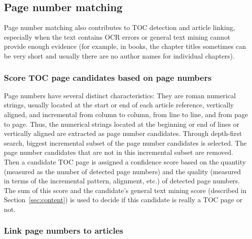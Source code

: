 \documentclass[10pt]{article}
\begin{document}
\subsection{Page number matching}

Page number matching also contributes to TOC detection and article linking, especially when the text contains OCR errors or general text mining cannot provide enough evidence (for example, in books, the chapter titles sometimes can be very short and usually there are no author names for individual chapters).

\subsubsection{Score TOC page candidates based on page numbers}

Page numbers have several distinct characteristics: They are roman numerical strings, usually located at the start or end of each article reference, vertically aligned, and incremental from column to column, from line to line, and from page to page. Thus, the numerical strings located at the beginning or end of lines or vertically aligned are extracted as page number candidates. Through depth-first search, biggest incremental subset of the page number candidates is selected. The page number candidates that are not in this incremental subset are removed. Then a candidate TOC page is assigned a confidence score based on the quantity (measured as the number of detected page numbers) and the quality (measured in terms of the incremental pattern, alignment, etc.) of detected page numbers. The sum of this score and the candidate's general text mining score (described in Section~\ref{sec:content}) is used to decide if this candidate is really a TOC page or not.

\subsubsection{Link page numbers to articles}
\end{document}
